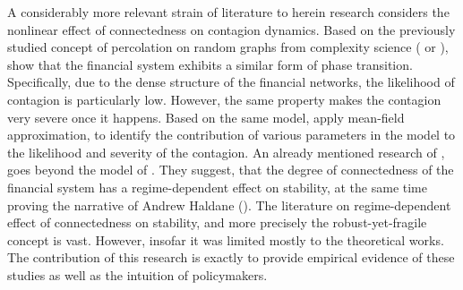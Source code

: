 \documentclass[12pt]{article}
\begin{document}
A considerably more relevant strain of literature to herein research considers the nonlinear effect of connectedness on contagion dynamics. Based on the previously studied concept of percolation on random graphs from complexity science (\cite{callaway00} or \cite{newman001}), \cite{gai10} show that the financial system exhibits a similar form of phase transition. Specifically, due to the dense structure of the financial networks, the likelihood of contagion is particularly low. However, the same property makes the contagion very severe once it happens. Based on the same model, \cite{may10} apply mean-field approximation, to identify the contribution of various parameters in the model to the likelihood and severity of the contagion. An already mentioned research of \cite{acemoglu13}, goes beyond the model of \cite{gai10}. They suggest, that the degree of connectedness of the financial system has a regime-dependent effect on stability, at the same time proving the narrative of Andrew Haldane (\cite{haldane13}). The literature on regime-dependent effect of connectedness on stability, and more precisely the robust-yet-fragile concept is vast. However, insofar it was limited mostly to the theoretical works. The contribution of this research is exactly to provide empirical evidence of these studies as well as the intuition of policymakers.  
\end{document}
